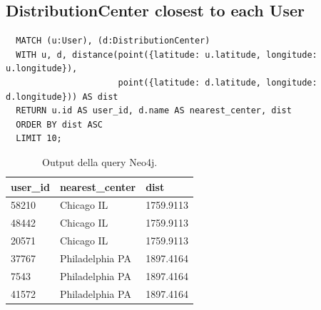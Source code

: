 \documentclass[a4paper,12pt]{article}
\begin{document}
\subsection{DistributionCenter closest to each User}
\begin{verbatim}
  MATCH (u:User), (d:DistributionCenter)
  WITH u, d, distance(point({latitude: u.latitude, longitude: u.longitude}),
                      point({latitude: d.latitude, longitude: d.longitude})) AS dist
  RETURN u.id AS user_id, d.name AS nearest_center, dist
  ORDER BY dist ASC
  LIMIT 10;
\end{verbatim}
\begin{table}[h!]
  \centering
  \begin{tabular}{lll}
  \toprule
  \textbf{user\_id} & \textbf{nearest\_center} & \textbf{dist} \\ 
  \midrule
  58210 & Chicago IL & 1759.9113 \\ 
  48442 & Chicago IL & 1759.9113 \\ 
  20571 & Chicago IL & 1759.9113 \\ 
  37767 & Philadelphia PA & 1897.4164 \\ 
  7543  & Philadelphia PA & 1897.4164 \\ 
  41572 & Philadelphia PA & 1897.4164 \\ 
  \bottomrule
  \end{tabular}
  \caption{Output della query Neo4j.}
  \label{tab:query_output}
  \end{table}
\end{document}

